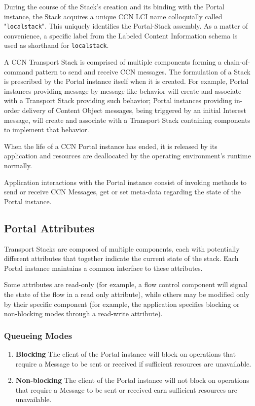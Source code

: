 During the course of the Stack's creation and its binding with the Portal instance,
the Stack acquires a unique CCN LCI name colloquially called "{\tt localstack}". This uniquely identifies the Portal-Stack assembly.
As a matter of convenience, a specific label from the Labeled Content Information schema is used as shorthand for {\tt localstack}.

A CCN Transport Stack is comprised of multiple components forming a chain-of-command pattern to send and receive CCN messages.
The formulation of a Stack is prescribed by the Portal instance itself when it is created. For example, Portal instances providing message-by-message-like behavior will create and associate with a Transport Stack providing such behavior; 
Portal instances providing in-order delivery of Content Object messages, being triggered by an initial Interest message,
will create and associate with a Transport Stack containing components to implement that behavior.

When the life of a CCN Portal instance has ended,
it is released by its application and resources are deallocated by the operating environment's runtime normally.

Application interactions with the Portal instance consist of invoking methods to send or receive CCN Messages, get or set meta-data regarding the state of the Portal instance.

\subsection{Portal Attributes}
Transport Stacks are composed of multiple components,
 each with potentially different attributes that together
indicate the current state of the stack. 
Each Portal instance maintains a common interface to these attributes.
 
Some attributes are read-only (for example, a flow control component will signal the state of the flow in a read only attribute),
while others may be modified only by their specific component (for example, the application specifies blocking or non-blocking modes
through a read-write attribute).


\subsubsection{Queueing Modes}

\begin{enumerate}
\item {\bf Blocking}
The client of the Portal instance will block on operations that require a Message to be sent or received if sufficient resources are unavailable.
\item {\bf Non-blocking}
The client of the Portal instance will not block on operations that require a Message to be sent or received earn sufficient resources are unavailable.
\end{enumerate}


